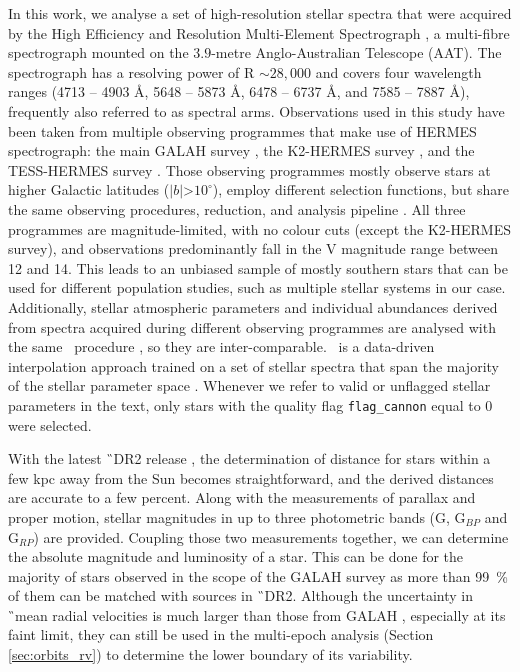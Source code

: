 In this work, we analyse a set of high-resolution stellar spectra that were acquired by the High Efficiency and Resolution Multi-Element Spectrograph \citep[HERMES,][]{2010SPIE.7735E..09B, 2015JATIS...1c5002S}, a multi-fibre spectrograph mounted on the $3.9$-metre Anglo-Australian Telescope (AAT). The spectrograph has a resolving power of R $\sim 28,000$ and covers four wavelength ranges (4713 -- 4903 \AA, 5648 -- 5873 \AA, 6478 -- 6737 \AA, and 7585 -- 7887 \AA), frequently also referred to as spectral arms. Observations used in this study have been taken from multiple observing programmes that make use of HERMES spectrograph: the main GALAH survey \citep{2015MNRAS.449.2604D}, the K2-HERMES survey \citep{2018AJ....155...84W}, and the TESS-HERMES survey \citep{2018MNRAS.473.2004S}. Those observing programmes mostly observe stars at higher Galactic latitudes ($|b|$>$10^\circ$), employ different selection functions, but share the same observing procedures, reduction, and analysis pipeline \citep[internal version $5.3$,][]{2017MNRAS.464.1259K}. All three programmes are magnitude-limited, with no colour cuts (except the K2-HERMES survey), and observations predominantly fall in the V magnitude range between 12 and 14. This leads to an unbiased sample of mostly southern stars that can be used for different population studies, such as multiple stellar systems in our case. Additionally, stellar atmospheric parameters and individual abundances derived from spectra acquired during different observing programmes are analysed with the same \TC\ procedure \citep[internal version 182112 that uses parallax information to infer \Logg\ of a star,][]{2015ApJ...808...16N, buder2018}, so they are inter-comparable. \TC\ is a data-driven interpolation approach trained on a set of stellar spectra that span the majority of the stellar parameter space \citep[for details, see][]{buder2018}. Whenever we refer to valid or unflagged stellar parameters in the text, only stars with the quality flag \texttt{flag\_cannon} equal to 0 were selected.

With the latest \G\ DR2 release \citep{2016A&A...595A...1G, 2018arXiv180409365G}, the determination of distance for stars within a few kpc away from the Sun becomes straightforward, and the derived distances are accurate to a few percent. Along with the measurements of parallax and proper motion, stellar magnitudes in up to three photometric bands (G, G$_{BP}$ and G$_{RP}$) are provided. Coupling those two measurements together, we can determine the absolute magnitude and luminosity of a star. This can be done for the majority of stars observed in the scope of the GALAH survey as more than 99~\% of them can be matched with sources in \G\ DR2. Although the uncertainty in \G\ mean radial velocities is much larger than those from GALAH \citep{2018arXiv180406344Z}, especially at its faint limit, they can still be used in the multi-epoch analysis (Section \ref{sec:orbits_rv}) to determine the lower boundary of its variability.

